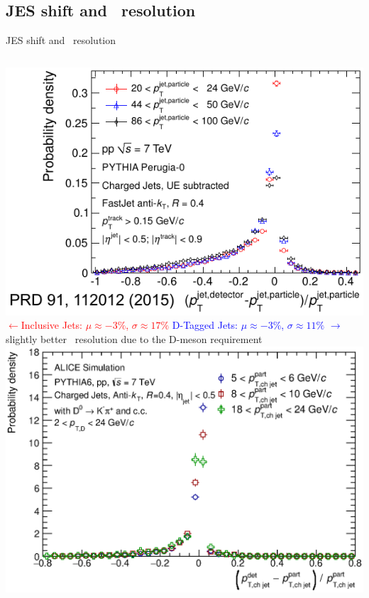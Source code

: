 \documentclass{beamer}
\begin{document}
\subsection{JES shift and \pt\ resolution}
\begin{frame}{JES shift and \pt\ resolution}

\begin{columns}
\includegraphics[width=\textwidth]{img/ALICE_JetRes}
\centering
\textcolor{red}{$\leftarrow$Inclusive Jets: $\mu\approx -3\%$, \textbf{$\sigma\approx17\%$}}
\textcolor{blue}{D-Tagged Jets: $\mu\approx -3\%$, \textbf{$\sigma\approx11\%$ }$\rightarrow$}
slightly better \pt\ resolution due to the D-meson requirement
\includegraphics[width=\textwidth]{img/HQ16_Simulation_DetectorResponse}
\end{columns}

\end{frame}
\end{document}
